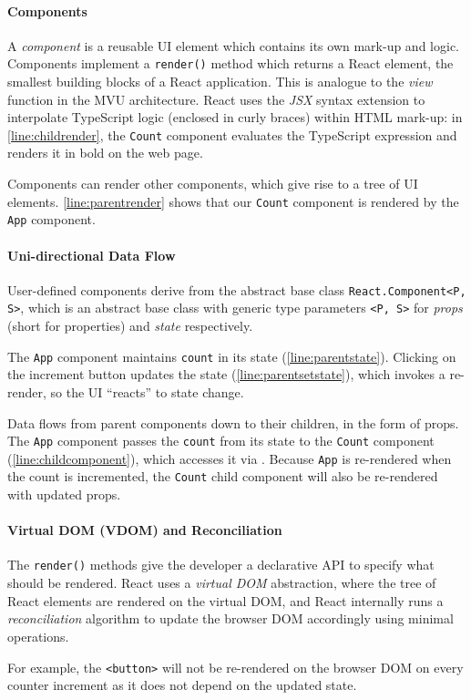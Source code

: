 \paragraph{Components}
A \textit{component} is a reusable UI element which
contains its own mark-up and logic.
Components implement a \texttt{render()} method which returns
a React element, the smallest building blocks of a React application.
This is analogue to the \textit{view} function in the MVU architecture.
React uses the \textit{JSX} syntax extension \cite{JSX}
to interpolate TypeScript logic 
(enclosed in curly braces)
within HTML mark-up: 
in \cref{line:childrender}, the \texttt{Count} component
evaluates the TypeScript expression 
 and renders it in bold on the web page.

Components can render other components, which give rise to
a tree of UI elements. \cref{line:parentrender} shows that our
\texttt{Count} component is rendered by 
the \texttt{App} component.

\paragraph{Uni-directional Data Flow}
User-defined components derive from the abstract base class
\texttt{React.Component<P, S>},
which is an abstract base class with generic type parameters
\texttt{<P, S>} for \textit{props} (short for properties) and 
\textit{state} respectively.

The \texttt{App} component maintains \texttt{count} in its
state (\cref{line:parentstate}). Clicking on the increment button
updates the state (\cref{line:parentsetstate}), which invokes
a re-render, so the UI ``reacts'' to state change.

Data flows from parent components down to their children,
in the form of props. 
The \texttt{App} component passes the \texttt{count}
from its state to the \texttt{Count} component 
(\cref{line:childcomponent}), which accesses it via
. 
Because \texttt{App} is re-rendered when the count is incremented,
the \texttt{Count} child component will also be re-rendered
with updated props.

\paragraph{Virtual DOM (VDOM) and Reconciliation}
The \texttt{render()} methods give the developer a declarative API
to specify what should be rendered. React uses a 
\textit{virtual DOM} abstraction, where the tree of React elements
are rendered on the virtual DOM, and React internally
runs a \textit{reconciliation} algorithm to update the browser DOM
accordingly using minimal operations.

For example, the \texttt{<button>} will not be re-rendered
on the browser DOM on every counter increment as it does not
depend on the updated state.
